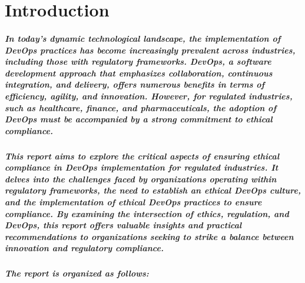 \chapter{Introduction}

\paragraph{In today's dynamic technological landscape, the implementation of DevOps practices has become increasingly prevalent across industries, including those with regulatory frameworks. DevOps, a software development approach that emphasizes collaboration, continuous integration, and delivery, offers numerous benefits in terms of efficiency, agility, and innovation. However, for regulated industries, such as healthcare, finance, and pharmaceuticals, the adoption of DevOps must be accompanied by a strong commitment to ethical compliance.}

\paragraph{This report aims to explore the critical aspects of ensuring ethical compliance in DevOps implementation for regulated industries. It delves into the challenges faced by organizations operating within regulatory frameworks, the need to establish an ethical DevOps culture, and the implementation of ethical DevOps practices to ensure compliance. By examining the intersection of ethics, regulation, and DevOps, this report offers valuable insights and practical recommendations to organizations seeking to strike a balance between innovation and regulatory compliance.}

\paragraph{The report is organized as follows:}

